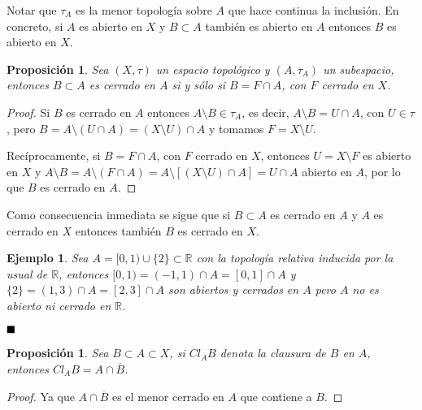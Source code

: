 \documentclass[12pt]{article}
\newtheorem{proposition}[theorem]{Proposición}
\newtheorem{example}{Ejemplo}[theorem]
\begin{document}
Notar que $\tau_A$ es la menor topología sobre $A$ que hace continua la inclusión. En concreto, si $A$ es abierto en $X$ y $B \subset A$ también es abierto en $A$ entonces $B$ es abierto en $X$.

\begin{proposition}Sea $(X, \tau)$ un espacio topológico y $(A, \tau_A)$ un subespacio, entonces $B \subset A$ es cerrado en $A$ si y sólo si $B = F \cap A$, con $F$ cerrado en $X$.
\end{proposition}
\begin{proof}
Si $B$ es cerrado en $A$ entonces $A \setminus B \in \tau_A$, es decir, $A \setminus B = U \cap A$, con $U \in \tau$, pero $B = A \setminus (U \cap A) = (X \setminus U ) \cap A$ y tomamos $F = X \setminus U.$

Recíprocamente, si $B = F \cap A$, con $F$ cerrado en $X$, entonces $U = X \setminus F$ es abierto en $X$ y $A \setminus B = A \setminus (F \cap A) = A \setminus [(X \setminus U) \cap A] = U \cap A$ abierto en $A$, por lo que $B$ es cerrado en $A$.

\end{proof}

Como consecuencia inmediata se sigue que si $B \subset A$ es cerrado en $A$ y $A$ es cerrado en $X$ entonces también $B$ es cerrado en $X$.

\begin{example}
Sea $A = [0,1) \cup \lbrace 2 \rbrace \subset \mathbb{R}$ con la topología relativa inducida por la usual de $\mathbb{R}$, entonces $[0,1) = (-1, 1) \cap A = [0,1] \cap A$ y $\lbrace 2 \rbrace = (1,3) \cap A = [2,3] \cap A$ son abiertos y cerrados en $A$ pero $A$ no es abierto ni cerrado en $\mathbb{R}$.
\end{example}
$\hfill \blacksquare$

\begin{proposition}Sea $B \subset A \subset X$, si $Cl_A B$ denota la clausura de $B$ en $A$, entonces $Cl_A B = A \cap \overline{B}$.
\end{proposition}
\begin{proof}
Ya que $A \cap \overline{B}$ es el menor cerrado en $A$ que contiene a $B$. 

\end{proof}
\end{document}
